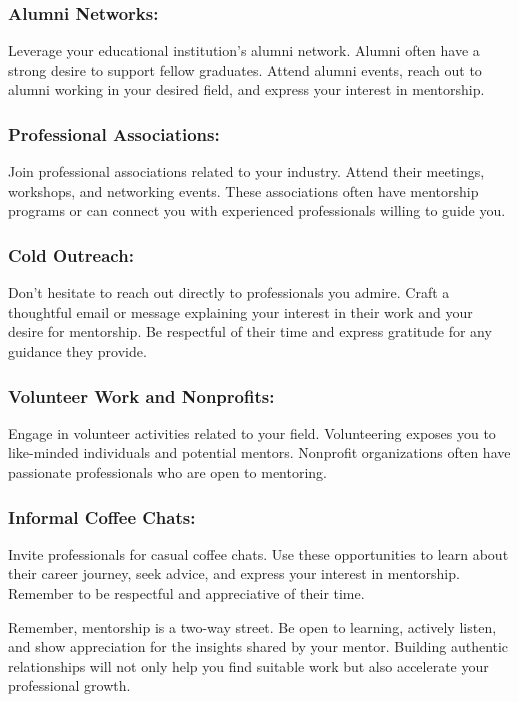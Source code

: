 \subsubsection*{Alumni Networks:}
   Leverage your educational institution's alumni network. Alumni often have a strong desire to support fellow graduates. Attend alumni events, reach out to alumni working in your desired field, and express your interest in mentorship.

\subsubsection*{Professional Associations:}
   Join professional associations related to your industry. Attend their meetings, workshops, and networking events. These associations often have mentorship programs or can connect you with experienced professionals willing to guide you.

\subsubsection*{Cold Outreach:}
   Don't hesitate to reach out directly to professionals you admire. Craft a thoughtful email or message explaining your interest in their work and your desire for mentorship. Be respectful of their time and express gratitude for any guidance they provide.

\subsubsection*{Volunteer Work and Nonprofits:}
   Engage in volunteer activities related to your field. Volunteering exposes you to like-minded individuals and potential mentors. Nonprofit organizations often have passionate professionals who are open to mentoring.

\subsubsection*{Informal Coffee Chats:}
   Invite professionals for casual coffee chats. Use these opportunities to learn about their career journey, seek advice, and express your interest in mentorship. Remember to be respectful and appreciative of their time.

Remember, mentorship is a two-way street. Be open to learning, actively listen, and show appreciation for the insights shared by your mentor. Building authentic relationships will not only help you find suitable work but also accelerate your professional growth.

